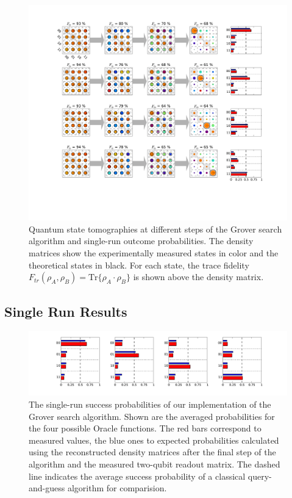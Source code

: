 \begin{figure}[ht!]
	\centering
		\includegraphics[width=1.\textwidth]{"./data/ct5/2011_04_21 - grover and tomo/good_data/grover algorithm - single run results - density matrices only"}
	\caption[Quantum state tomographies at different steps during the Grover search algorithm and single-run outcome probabilities]{Quantum state tomographies at different steps of the Grover search algorithm and single-run outcome probabilities. The density matrices show the experimentally measured states in color and the theoretical states in black. For each state, the trace fidelity $F_{tr}(\rho_A,\rho_B) = \mathrm{Tr}\{\rho_A\cdot\rho_B\}$ is shown above the density matrix.}
	\label{fig:GroverAlgorithmExperimentalResults}
\end{figure}

\subsection{Single Run Results}

\begin{figure}[ht!]
	\centering
		\includegraphics[width=1.\textwidth]{"./data/ct5/2011_04_21 - grover and tomo/good_data/grover algorithm - single run probabilities"}
		\caption[Single-run success probabilities of the Grover search algorithm]{The single-run success probabilities of our implementation of the Grover search algorithm. Shown are the averaged probabilities for the four possible Oracle functions. The red bars correspond to measured values, the blue ones to expected probabilities calculated using the reconstructed density matrices after the final step of the algorithm and the measured two-qubit readout matrix. The dashed line indicates the average success probability of a classical query-and-guess algorithm for comparision.}
	\label{fig:GroverSingleShotResults}
\end{figure}

